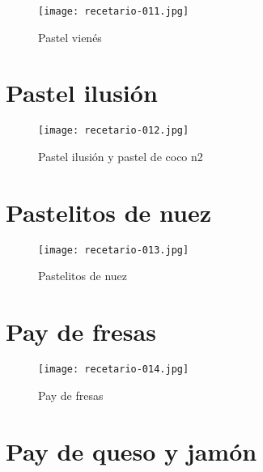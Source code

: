 \documentclass[12pt,letterpaper]{article}
\begin{document}
    \begin{figure}[H]
      \vspace{2pt}
    \texttt{[image: recetario-011.jpg]}
      \caption{Pastel vienés}
      
    \end{figure}


\newpage

  \section{Pastel ilusión}
  
    \begin{figure}[H]
      \vspace{2pt}
    \texttt{[image: recetario-012.jpg]}
      \caption{Pastel ilusión y pastel de coco n2 }
      
    \end{figure}

\newpage

  \section{Pastelitos de nuez}
  
    \begin{figure}[H]
      \vspace{2pt}
    \texttt{[image: recetario-013.jpg]}
      \caption{Pastelitos de nuez}
      
    \end{figure}

\newpage

  \section{Pay de fresas}
  
    \begin{figure}[H]
      \vspace{2pt}
    \texttt{[image: recetario-014.jpg]}
      \caption{Pay de fresas}
      
    \end{figure}

\newpage

  \section{Pay de queso y jamón}
  
\end{document}
